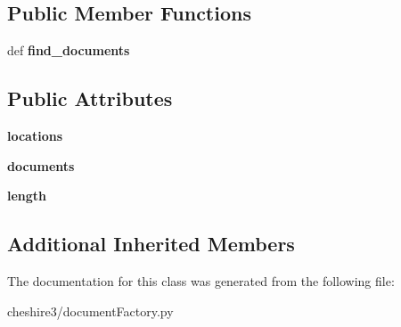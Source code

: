 \subsection*{Public Member Functions}
\begin{DoxyCompactItemize}
\item 
\hypertarget{classcheshire3_1_1document_factory_1_1_marc_document_stream_a303be6e379c509a64469d24b89957252}{def {\bfseries find\-\_\-documents}}\label{classcheshire3_1_1document_factory_1_1_marc_document_stream_a303be6e379c509a64469d24b89957252}

\end{DoxyCompactItemize}
\subsection*{Public Attributes}
\begin{DoxyCompactItemize}
\item 
\hypertarget{classcheshire3_1_1document_factory_1_1_marc_document_stream_a4a9f03fdf272846ec98ecf810cffb6b7}{{\bfseries locations}}\label{classcheshire3_1_1document_factory_1_1_marc_document_stream_a4a9f03fdf272846ec98ecf810cffb6b7}

\item 
\hypertarget{classcheshire3_1_1document_factory_1_1_marc_document_stream_af653f80d745c2c40d902c1e538c3f564}{{\bfseries documents}}\label{classcheshire3_1_1document_factory_1_1_marc_document_stream_af653f80d745c2c40d902c1e538c3f564}

\item 
\hypertarget{classcheshire3_1_1document_factory_1_1_marc_document_stream_a1306a6e039393b5cb6fd2cda69c8ef7c}{{\bfseries length}}\label{classcheshire3_1_1document_factory_1_1_marc_document_stream_a1306a6e039393b5cb6fd2cda69c8ef7c}

\end{DoxyCompactItemize}
\subsection*{Additional Inherited Members}


The documentation for this class was generated from the following file\-:\begin{DoxyCompactItemize}
\item 
cheshire3/document\-Factory.\-py\end{DoxyCompactItemize}
